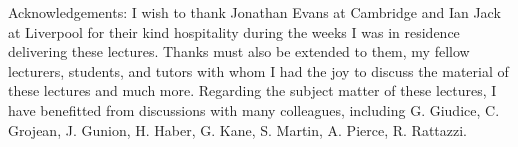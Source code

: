\documentclass[12pt]{article}
\begin{document}
\bigskip\bigskip
\noindent
{\sc Acknowledgements:}
I wish to thank Jonathan Evans at Cambridge and Ian Jack at Liverpool for their kind hospitality during the weeks I was in residence delivering these lectures. Thanks must also be extended to them, my fellow lecturers, students, and tutors with whom I had the joy to discuss the material of these lectures and much more.  Regarding the subject matter of these lectures, I have benefitted from discussions with many colleagues, including G. Giudice, C. Grojean, J. Gunion, H. Haber, G. Kane, S. Martin, A. Pierce, R. Rattazzi.







\end{document}
